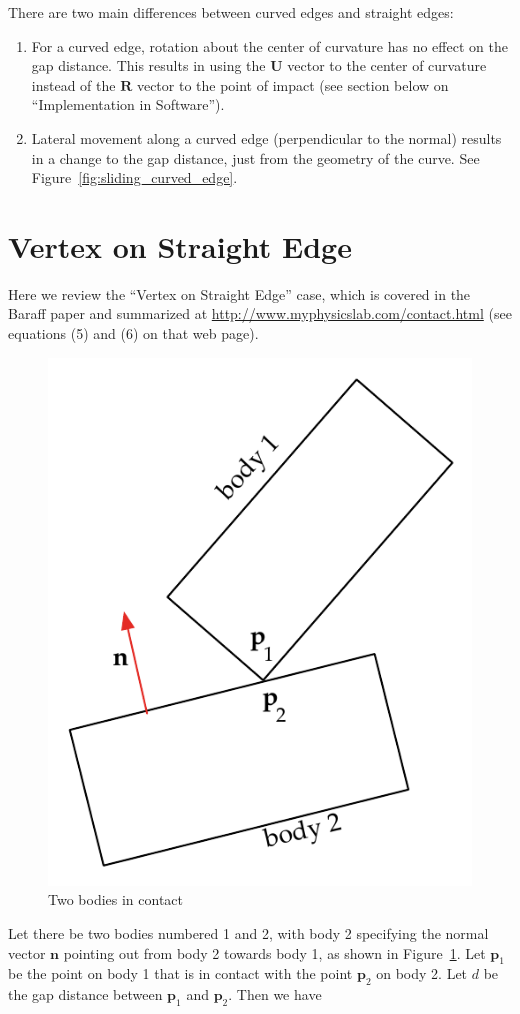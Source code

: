 \documentclass[final]{article}
\begin{document}
There are two main differences between curved edges and straight edges:

\begin{enumerate}

  \item For a curved edge, rotation about the center of curvature has no effect on the
  gap distance. This results in using the $\mathbf{U}$ vector to the center of curvature
  instead of the $\mathbf{R}$ vector to the point of impact (see section below on
  ``Implementation in Software'').

  \item Lateral movement along a curved edge (perpendicular to the normal) results in a
  change to the gap distance, just from the geometry of the curve. See
  Figure~\ref{fig:sliding_curved_edge}.

\end{enumerate}



\section{Vertex on Straight Edge}

Here we review the ``Vertex on Straight Edge'' case, which is covered in the Baraff
paper \cite{dB94} and summarized at \url{http://www.myphysicslab.com/contact.html} (see
equations (5) and (6) on that web page).

\begin{figure}[ht]
    \centering
    \includegraphics[width=0.45 \textwidth]{CEP_vertex_straight_edge.pdf}
    \caption{Two bodies in contact}
    \label{fig:two_bodies_in_contact}
\end{figure}

Let there be two bodies numbered 1 and 2, with body 2 specifying the normal vector
$\mathbf{n}$ pointing out from body 2 towards body 1, as shown in
Figure~\ref{fig:two_bodies_in_contact}. Let $\mathbf{p}_1$ be the point on body 1 that
is in contact with the point $\mathbf{p}_2$ on body 2. Let $d$ be the gap distance
between $\mathbf{p}_1$ and $\mathbf{p}_2$. Then we have
\end{document}
